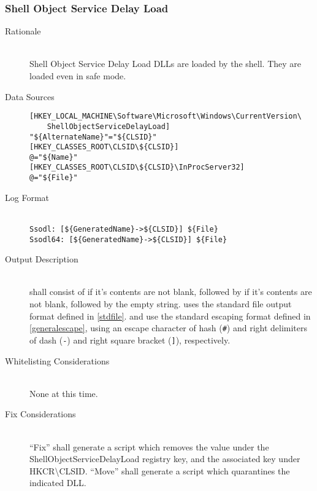 \subsubsection{Shell Object Service Delay Load}
\begin{description}
\item[Rationale] \hfill \\
Shell Object Service Delay Load DLLs are loaded by the shell. They are loaded
even in safe mode.
\item[Data Sources] \hfill
\vspace{-\baselineskip}
\begin{verbatim}
[HKEY_LOCAL_MACHINE\Software\Microsoft\Windows\CurrentVersion\
    ShellObjectServiceDelayLoad]
"${AlternateName}"="${CLSID}"
[HKEY_CLASSES_ROOT\CLSID\${CLSID}]
@="${Name}"
[HKEY_CLASSES_ROOT\CLSID\${CLSID}\InProcServer32]
@="${File}"
\end{verbatim}
\item[Log Format] \hfill \\
\verb|Ssodl: [${GeneratedName}->${CLSID}] ${File}| \\
\verb|Ssodl64: [${GeneratedName}->${CLSID}] ${File}|
\item[Output Description] \hfill \\
 shall consist of  if it's
contents are not blank, followed by  if it's contents are
not blank, followed by the empty string. \var{File} uses the standard file
output format defined in \ref{stdfile}. \var{GeneratedName} and \var{CLSID} use
the standard escaping format defined in \ref{generalescape}, using an escape
character of hash (\verb|#|) and right delimiters of dash (\verb|-|) and
right square bracket (\verb|]|), respectively.
\item[Whitelisting Considerations] \hfill \\
None at this time.
\item[Fix Considerations] \hfill \\
``Fix'' shall generate a script which removes the value under the
ShellObjectServiceDelayLoad registry key, and the associated key under
HKCR\textbackslash{}CLSID.
``Move'' shall generate a script which quarantines the indicated DLL.
\end{description}

